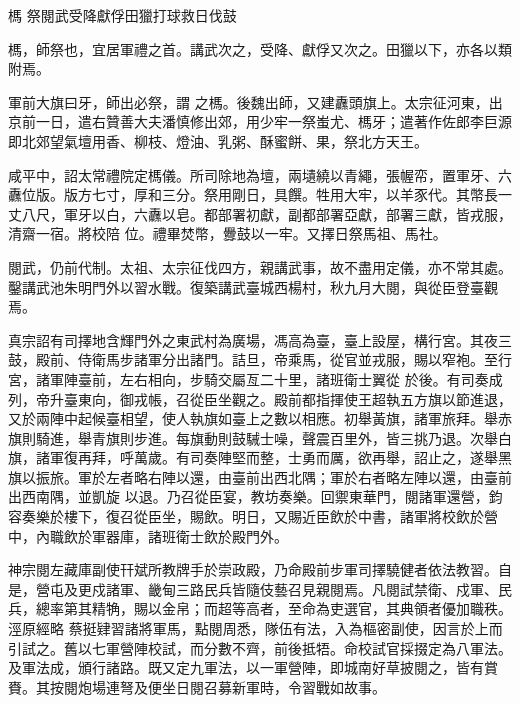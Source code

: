 
\begin{pinyinscope}

 榪
 祭閱武受降獻俘田獵打球救日伐鼓



 榪，師祭也，宜居軍禮之首。講武次之，受降、獻俘又次之。田獵以下，亦各以類附焉。



 軍前大旗曰牙，師出必祭，謂
 之榪。後魏出師，又建纛頭旗上。太宗征河東，出京前一日，遣右贊善大夫潘慎修出郊，用少牢一祭蚩尤、榪牙；遣著作佐郎李巨源即北郊望氣壇用香、柳枝、燈油、乳粥、酥蜜餅、果，祭北方天王。



 咸平中，詔太常禮院定榪儀。所司除地為壇，兩壝繞以青繩，張幄帟，置軍牙、六纛位版。版方七寸，厚和三分。祭用剛日，具饌。牲用大牢，以羊豕代。其幣長一丈八尺，軍牙以白，六纛以皂。都部署初獻，副都部署亞獻，部署三獻，皆戎服，清齋一宿。將校陪
 位。禮畢焚幣，釁鼓以一牢。又擇日祭馬祖、馬社。



 閱武，仍前代制。太祖、太宗征伐四方，親講武事，故不盡用定儀，亦不常其處。鑿講武池朱明門外以習水戰。復築講武臺城西楊村，秋九月大閱，與從臣登臺觀焉。



 真宗詔有司擇地含輝門外之東武村為廣場，馮高為臺，臺上設屋，構行宮。其夜三鼓，殿前、侍衛馬步諸軍分出諸門。詰旦，帝乘馬，從官並戎服，賜以窄袍。至行宮，諸軍陣臺前，左右相向，步騎交屬亙二十里，諸班衛士翼從
 於後。有司奏成列，帝升臺東向，御戎帳，召從臣坐觀之。殿前都指揮使王超執五方旗以節進退，又於兩陣中起候臺相望，使人執旗如臺上之數以相應。初舉黃旗，諸軍旅拜。舉赤旗則騎進，舉青旗則步進。每旗動則鼓駴士噪，聲震百里外，皆三挑乃退。次舉白旗，諸軍復再拜，呼萬歲。有司奏陣堅而整，士勇而厲，欲再舉，詔止之，遂舉黑旗以振旅。軍於左者略右陣以還，由臺前出西北隅；軍於右者略左陣以還，由臺前出西南隅，並凱旋
 以退。乃召從臣宴，教坊奏樂。回禦東華門，閱諸軍還營，鈞容奏樂於樓下，復召從臣坐，賜飲。明日，又賜近臣飲於中書，諸軍將校飲於營中，內職飲於軍器庫，諸班衛士飲於殿門外。



 神宗閱左藏庫副使幵斌所教牌手於崇政殿，乃命殿前步軍司擇驍健者依法教習。自是，營屯及更戍諸軍、畿甸三路民兵皆隨伎藝召見親閱焉。凡閱試禁衛、戍軍、民兵，總率第其精觕，賜以金帛；而超等高者，至命為吏選官，其典領者優加職秩。涇原經略
 蔡挺肄習諸將軍馬，點閱周悉，隊伍有法，入為樞密副使，因言於上而引試之。舊以七軍營陣校試，而分數不齊，前後抵牾。命校試官採掇定為八軍法。及軍法成，頒行諸路。既又定九軍法，以一軍營陣，即城南好草披閱之，皆有賞賚。其按閱炮場連弩及便坐日閱召募新軍時，令習戰如故事。




\end{pinyinscope}
